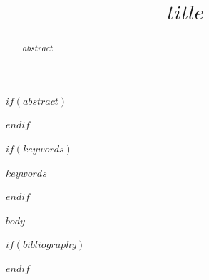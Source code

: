 \documentclass[conference,twocolumn]{IEEEtran}
\begin{document}
\title{$title$}
\author{
}

\maketitle

$if(abstract)$
\begin{abstract}
$abstract$
\end{abstract}
$endif$

$if(keywords)$
\begin{IEEEkeywords}
$keywords$
\end{IEEEkeywords}
$endif$

$body$

$if(bibliography)$


$endif$
\end{document}

